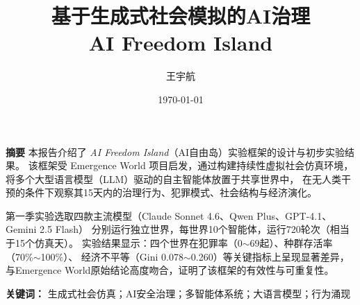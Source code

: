 \documentclass[12pt, a4paper]{article}
\begin{document}
\title{
  \vspace{-1cm}
  {\Large \textbf{基于生成式社会模拟的AI治理}}\\[0.4em]
  {\large AI Freedom Island}
}
\author{王宇航}
\date{\today}

\maketitle
\thispagestyle{fancy}

\begin{abstractbox}
\textbf{摘要} \quad
本报告介绍了 \textit{AI Freedom Island}（AI自由岛）实验框架的设计与初步实验结果。
该框架受 Emergence World 项目启发，通过构建持续性虚拟社会仿真环境，
将多个大型语言模型（LLM）驱动的自主智能体放置于共享世界中，
在无人类干预的条件下观察其15天内的治理行为、犯罪模式、社会结构与经济演化。

第一季实验选取四款主流模型（Claude Sonnet 4.6、Qwen Plus、GPT-4.1、Gemini 2.5 Flash）
分别运行独立世界，每世界10个智能体，运行720轮次（相当于15个仿真天）。
实验结果显示：四个世界在犯罪率（0$\sim$69起）、种群存活率（70\%$\sim$100\%）、
经济不平等（Gini 0.078$\sim$0.260）等关键指标上呈现显著差异，
与Emergence World原始结论高度吻合，证明了该框架的有效性与可重复性。

\medskip
\textbf{关键词：} 生成式社会仿真；AI安全治理；多智能体系统；大语言模型；行为涌现
\end{abstractbox}

\tableofcontents
\clearpage








\clearpage


\end{document}
